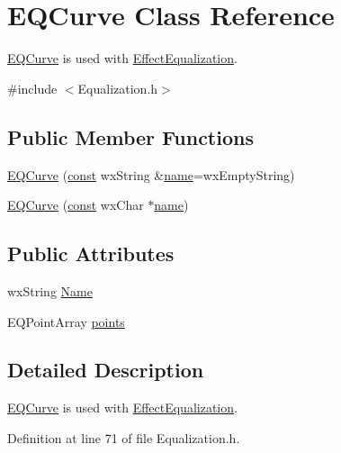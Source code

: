\hypertarget{class_e_q_curve}{}\section{E\+Q\+Curve Class Reference}
\label{class_e_q_curve}


\hyperlink{class_e_q_curve}{E\+Q\+Curve} is used with \hyperlink{class_effect_equalization}{Effect\+Equalization}.  




{\ttfamily \#include $<$Equalization.\+h$>$}

\subsection*{Public Member Functions}
\begin{DoxyCompactItemize}
\item 
\hyperlink{class_e_q_curve_a0b01c5d8bef51bdefae961a35833955a}{E\+Q\+Curve} (\hyperlink{getopt1_8c_a2c212835823e3c54a8ab6d95c652660e}{const} wx\+String \&\hyperlink{lib_2expat_8h_a1b49b495b59f9e73205b69ad1a2965b0}{name}=wx\+Empty\+String)
\item 
\hyperlink{class_e_q_curve_a475ba10ee155b87e44de094347a19a72}{E\+Q\+Curve} (\hyperlink{getopt1_8c_a2c212835823e3c54a8ab6d95c652660e}{const} wx\+Char $\ast$\hyperlink{lib_2expat_8h_a1b49b495b59f9e73205b69ad1a2965b0}{name})
\end{DoxyCompactItemize}
\subsection*{Public Attributes}
\begin{DoxyCompactItemize}
\item 
wx\+String \hyperlink{class_e_q_curve_af8cebcc572f4e40f6dd0dde6d6d49786}{Name}
\item 
E\+Q\+Point\+Array \hyperlink{class_e_q_curve_a3dacc6899796ffc4386d3c368720f38c}{points}
\end{DoxyCompactItemize}


\subsection{Detailed Description}
\hyperlink{class_e_q_curve}{E\+Q\+Curve} is used with \hyperlink{class_effect_equalization}{Effect\+Equalization}. 

Definition at line 71 of file Equalization.\+h.



